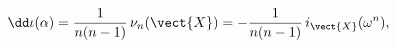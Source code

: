 \begin{equation}
  \dd\iota(\alpha) = \frac{1}{n(n-1)}\,\nu_n(\vect{X})
  = -\frac{1}{n(n-1)}\,i_{\vect{X}}(\omega^n),
\label{nunX}
\end{equation}

